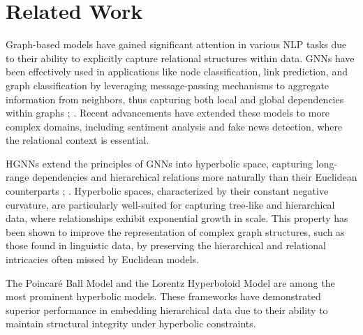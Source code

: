 \section{Related Work}
Graph-based models have gained significant attention in various NLP tasks due to their ability to explicitly capture relational structures within data. GNNs have been effectively used in applications like node classification, link prediction, and graph classification by leveraging message-passing mechanisms to aggregate information from neighbors, thus capturing both local and global dependencies within graphs \citep{4700287}; \citep{kipf2016semi}. Recent advancements have extended these models to more complex domains, including sentiment analysis and fake news detection, where the relational context is essential.

HGNNs extend the principles of GNNs into hyperbolic space, capturing long-range dependencies and hierarchical relations more naturally than their Euclidean counterparts \citep{nickel2017poincare}; \citep{chami2019hyperbolic}. Hyperbolic spaces, characterized by their constant negative curvature, are particularly well-suited for capturing tree-like and hierarchical data, where relationships exhibit exponential growth in scale. This property has been shown to improve the representation of complex graph structures, such as those found in linguistic data, by preserving the hierarchical and relational intricacies often missed by Euclidean models.

The Poincaré Ball Model \citep{nickel2017poincare} and the Lorentz Hyperboloid Model \citep{nickel2018learning} are among the most prominent hyperbolic models. These frameworks have demonstrated superior performance in embedding hierarchical data due to their ability to maintain structural integrity under hyperbolic constraints. 
